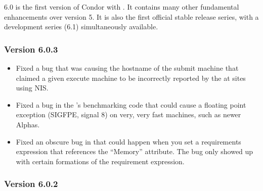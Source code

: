 6.0 is the first version of Condor with .
It contains many other fundamental enhancements over version 5.
It is also the first official stable release series, with a
development series (6.1) simultaneously available.

\subsubsection{\label{sec:New-6-0-3}Version 6.0.3}

\begin{itemize}

\item Fixed a bug that was causing the hostname of the submit machine
that claimed a given execute machine to be incorrectly reported by the
 at sites using NIS.

\item Fixed a bug in the 's benchmarking code that
could cause a floating point exception (SIGFPE, signal 8) on very,
very fast machines, such as newer Alphas.

\item Fixed an obscure bug in  that could happen when
you set a requirements expression that references the ``Memory''
attribute.
The bug only showed up with certain formations of the requirement
expression.

\end{itemize}


\subsubsection{\label{sec:New-6-0-2}Version 6.0.2}

